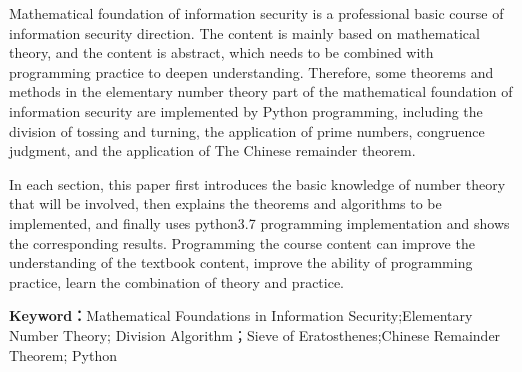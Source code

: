 \documentclass[UTF8]{ctexart}
\begin{document}
    \begin{enabstract}
      Mathematical foundation of information security is a professional basic course of information 
      security direction. The content is mainly based on mathematical theory, and the content is 
      abstract, which needs to be combined with programming practice to deepen understanding. 
      Therefore, some theorems and methods in the elementary number theory part of the mathematical 
      foundation of information security are implemented by Python programming, 
      including the division of tossing and turning, the application of prime numbers, 
      congruence judgment, and the application of The Chinese remainder theorem.
      \par In each section, this paper first introduces the basic knowledge of number theory that will be involved,
       then explains the theorems and algorithms to be implemented, 
       and finally uses python3.7 programming implementation and shows the corresponding results.
        Programming the course content can improve the understanding of the textbook content, 
        improve the ability of programming practice, learn the combination of theory and practice.
        \par\textbf{Keyword：}Mathematical Foundations in Information Security;Elementary Number Theory;
        Division Algorithm；Sieve of Eratosthenes;Chinese Remainder Theorem; Python
        \\
    \end{enabstract}


  \newpage
\pagestyle{fancy}
\fancyhf{}
\fancyhead[R]{\thepage}

\tableofcontents

\newpage
\setcounter{page}{1}
\setcounter{section}{-1}
\end{document}
